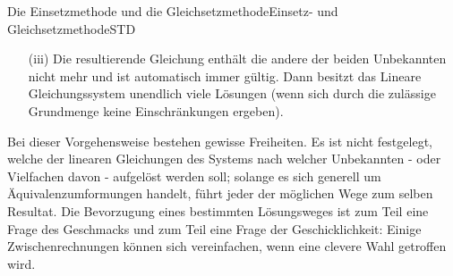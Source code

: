 \begin{MXContent}{Die Einsetzmethode und die Gleichsetzmethode}{Einsetz- und Gleichsetzmethode}{STD}
\begin{MInfo}
\begin{itemize}
{in sich dar. Dann besitzt das Lineare Gleichungssystem keine Lösung.}
\item[(iii)]{Die resultierende Gleichung enthält die andere der beiden Unbekannten nicht mehr und ist automatisch immer
gültig. Dann besitzt das Lineare Gleichungssystem unendlich viele Lösungen (wenn sich durch die zulässige Grundmenge keine Einschränkungen ergeben).}
\end{itemize}
\end{MInfo}
Bei dieser Vorgehensweise bestehen gewisse Freiheiten. Es ist nicht festgelegt, welche der linearen Gleichungen
des Systems nach welcher Unbekannten - oder Vielfachen davon - aufgelöst werden soll; solange es sich generell
um Äquivalenzumformungen handelt, führt jeder der möglichen Wege zum selben Resultat. Die Bevorzugung eines
bestimmten Lösungsweges ist zum Teil eine Frage des Geschmacks und zum Teil eine Frage der Geschicklichkeit:
Einige Zwischenrechnungen können sich vereinfachen, wenn eine clevere Wahl getroffen wird.


\end{MXContent}

